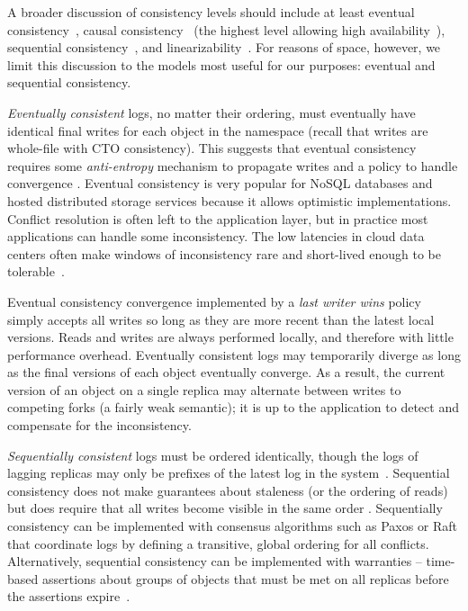 \documentclass[10pt,conference,letterpaper]{IEEEtran}
\begin{document}
A broader discussion of consistency levels should include at least eventual consistency~\cite{terry_managing_1995},
causal consistency~\cite{causal} (the highest level allowing high availability~\cite{bailis_bolt-causal_2013}),
sequential consistency~\cite{sequential-consistency}, and linearizability~\cite{herlihy_linearizability:_1990}.
For reasons of space, however, we limit this discussion to the models most
useful for our purposes:
eventual and sequential consistency.

\emph{Eventually consistent} logs, no matter their ordering, must eventually have identical final
writes for each object in the namespace (recall that writes are whole-file with CTO consistency).
This suggests that eventual consistency requires some \textit{anti-entropy} mechanism to
propagate writes and a policy to handle convergence \cite{terry_managing_1995}.
Eventual consistency is very popular for NoSQL databases and hosted distributed storage
services \cite{decandia_dynamo:_2007,lakshman_cassandra:_2010} because it allows
optimistic implementations.
Conflict resolution is often left to the application layer, but
in practice most applications can handle some inconsistency.
The low latencies in cloud data centers often make windows of
inconsistency rare and
short-lived enough to be tolerable~\cite{bailis_quantifying_2014}.

Eventual consistency convergence implemented by a \textit{last writer wins} policy simply accepts all
writes so long as they are more recent than the latest local versions.
Reads and writes are always performed locally, and therefore with little
performance overhead.
Eventually consistent logs may temporarily diverge as long as the final versions of each
object eventually converge.
As a result, the current version of an object on a single replica may alternate between writes to competing
forks (a fairly weak semantic); it is up to the application to detect and compensate for the
inconsistency.

\emph{Sequentially consistent} logs must be ordered identically, though the logs of
lagging replicas may only be prefixes of the latest log in the system~\cite{attiya_sequential_1994}.
Sequential consistency does not make guarantees about staleness
(or the ordering of reads) but does require that all writes become visible in the same
order \cite{bermbach_consistency_2013}.
Sequentially consistency can be implemented with consensus algorithms such as Paxos
\cite{lamport_fast_2006} or Raft \cite{ongaro_search_2014} that coordinate logs by
defining a transitive, global ordering for all conflicts.
Alternatively, sequential consistency can be implemented with warranties -- time-based
assertions about groups of objects that must be met on all replicas before the assertions
expire~\cite{liu_warranties_2014}.
\end{document}
